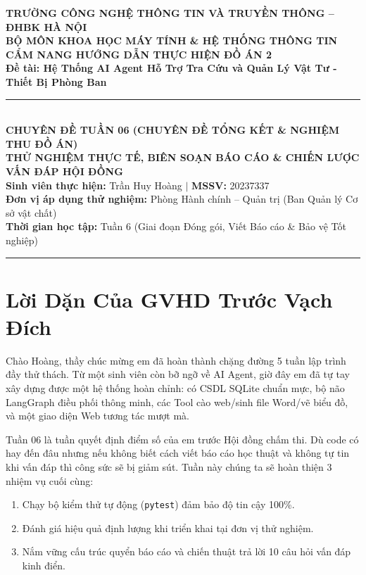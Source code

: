 \documentclass[11pt,a4paper]{article}
\begin{document}
\begin{center}
    {\large \textbf{TRƯỜNG CÔNG NGHỆ THÔNG TIN VÀ TRUYỀN THÔNG -- ĐHBK HÀ NỘI}}\\[0.2em]
    {\normalsize \textbf{BỘ MÔN KHOA HỌC MÁY TÍNH \& HỆ THỐNG THÔNG TIN}}\\[1.0em]
    
    {\Large \bfseries \color{blue!85!black} CẨM NANG HƯỚNG DẪN THỰC HIỆN ĐỒ ÁN 2}\\[0.3em]
    {\large \textbf{Đề tài: Hệ Thống AI Agent Hỗ Trợ Tra Cứu và Quản Lý Vật Tư - Thiết Bị Phòng Ban}}\\[0.8em]
    
    \rule{0.85\textwidth}{0.8pt}\\[0.6em]
    
    {\bfseries CHUYÊN ĐỀ TUẦN 06 (CHUYÊN ĐỀ TỔNG KẾT \& NGHIỆM THU ĐỒ ÁN)}\\[0.3em]
    {\large \bfseries THỬ NGHIỆM THỰC TẾ, BIÊN SOẠN BÁO CÁO \& CHIẾN LƯỢC VẤN ĐÁP HỘI ĐỒNG}\\[0.8em]
    
    \small
    \textbf{Sinh viên thực hiện:} Trần Huy Hoàng \quad $\vert$ \quad \textbf{MSSV:} 20237337\\
    \textbf{Đơn vị áp dụng thử nghiệm:} Phòng Hành chính -- Quản trị (Ban Quản lý Cơ sở vật chất)\\
    \textbf{Thời gian học tập:} Tuần 6 (Giai đoạn Đóng gói, Viết Báo cáo \& Bảo vệ Tốt nghiệp)
\end{center}

\vspace{0.2cm}
\hrule
\vspace{0.3cm}

\section{Lời Dặn Của GVHD Trước Vạch Đích}

Chào Hoàng, thầy chúc mừng em đã hoàn thành chặng đường 5 tuần lập trình đầy thử thách. Từ một sinh viên còn bỡ ngỡ về AI Agent, giờ đây em đã tự tay xây dựng được một hệ thống hoàn chỉnh: có CSDL SQLite chuẩn mực, bộ não LangGraph điều phối thông minh, các Tool cào web/sinh file Word/vẽ biểu đồ, và một giao diện Web tương tác mượt mà.

Tuần 06 là tuần quyết định điểm số của em trước Hội đồng chấm thi. Dù code có hay đến đâu nhưng nếu không biết cách viết báo cáo học thuật và không tự tin khi vấn đáp thì công sức sẽ bị giảm sút. Tuần này chúng ta sẽ hoàn thiện 3 nhiệm vụ cuối cùng:
\begin{enumerate}
    \item Chạy bộ kiểm thử tự động (\texttt{pytest}) đảm bảo độ tin cậy 100\%.
    \item Đánh giá hiệu quả định lượng khi triển khai tại đơn vị thử nghiệm.
    \item Nắm vững cấu trúc quyển báo cáo và chiến thuật trả lời 10 câu hỏi vấn đáp kinh điển.
\end{enumerate}
\end{document}
